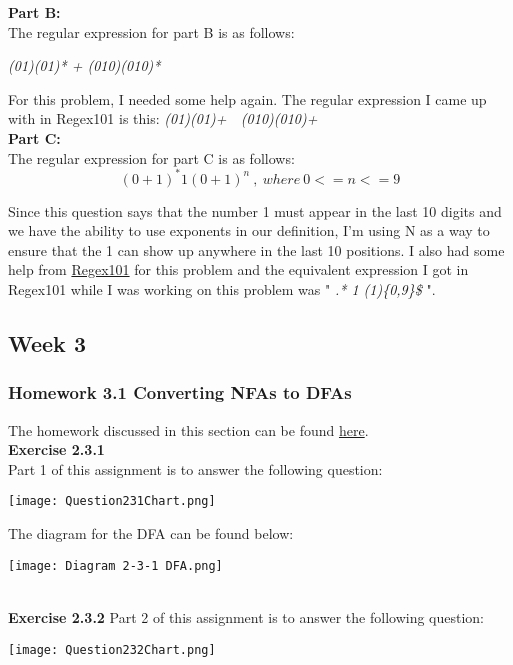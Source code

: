 \documentclass{article}
\theoremstyle{theorem}
\theoremstyle{definition}
\theoremstyle{remark}
\begin{document}
\textbf{Part B:}\\
The regular expression for part B is as follows:
\begin{center}
    \textit{(01)(01)* + (010)(010)*}
\end{center}
For this problem, I needed some help again. The regular expression I came up with in Regex101 is this: \textit{(01)(01)+\ \textpipe\ (010)(010)+}\\

\textbf{Part C:}\\
The regular expression for part C is as follows:
\begin{equation}
    (0+1)^* 1 (0+1)^n\ ,\ where\ 0 <= n <= 9
\end{equation}

Since this question says that the number 1 must appear in the last 10 digits and we have the ability to use exponents in our definition, I'm using N as a way to ensure that the 1 can show up anywhere in the last 10 positions. I also had some help from \href{https://regex101.com/}{Regex101} for this problem and the equivalent expression I got in Regex101 while I was working on this problem was " \textit{.* 1 (1)\{0,9\}\$} ".

\subsection{Week 3}
\subsubsection{Homework 3.1 Converting NFAs to DFAs}
The homework discussed in this section can be found \href{https://hackmd.io/@alexhkurz/HylLKujCP}{here}.\\
\textbf{Exercise 2.3.1}\\
Part 1 of this assignment is to answer the following question:
\begin{center}
    \texttt{[image: Question231Chart.png]}
\end{center}

The diagram for the DFA can be found below:
\begin{center}
    \texttt{[image: Diagram 2-3-1 DFA.png]}
\end{center}
\\
\textbf{Exercise 2.3.2}
Part 2 of this assignment is to answer the following question:
\begin{center}
    \texttt{[image: Question232Chart.png]}
\end{center}
\end{document}
